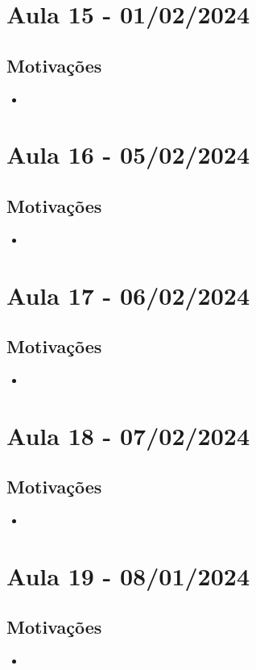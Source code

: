 \documentclass{article}
\begin{document}
\section{Aula 15 - 01/02/2024}
\subsection{Motivações}
\begin{itemize}
	\item
\end{itemize}
\newpage
\section{Aula 16 - 05/02/2024}
\subsection{Motivações}
\begin{itemize}
	\item
\end{itemize}
\newpage
\section{Aula 17 - 06/02/2024}
\subsection{Motivações}
\begin{itemize}
	\item
\end{itemize}
\newpage
\section{Aula 18 - 07/02/2024}
\subsection{Motivações}
\begin{itemize}
	\item
\end{itemize}
\newpage

\section{Aula 19 - 08/01/2024}
\subsection{Motivações}
\begin{itemize}
	\item
\end{itemize}
\newpage
\end{document}
